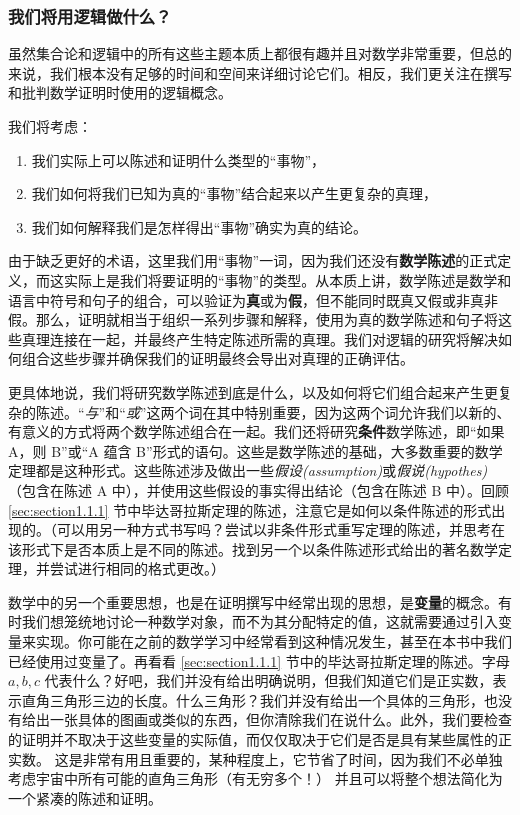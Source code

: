 \subsubsection*{我们将用逻辑做什么？}

虽然集合论和逻辑中的所有这些主题本质上都很有趣并且对数学非常重要，但总的来说，我们根本没有足够的时间和空间来详细讨论它们。相反，我们更关注在撰写和批判数学证明时使用的逻辑概念。

我们将考虑：

\begin{enumerate}
    \item 我们实际上可以陈述和证明什么类型的“事物”，
    \item 我们如何将我们已知为真的“事物”结合起来以产生更复杂的真理，
    \item 我们如何解释我们是怎样得出“事物”确实为真的结论。
\end{enumerate}

由于缺乏更好的术语，这里我们用“事物”一词，因为我们还没有\textbf{数学陈述}的正式定义，而这实际上是我们将要证明的“事物”的类型。从本质上讲，数学陈述是数学和语言中符号和句子的组合，可以验证为\textbf{真}或为\textbf{假}，但不能同时既真又假或非真非假。那么，证明就相当于组织一系列步骤和解释，使用为真的数学陈述和句子将这些真理连接在一起，并最终产生特定陈述所需的真理。我们对逻辑的研究将解决如何组合这些步骤并确保我们的证明最终会导出对真理的正确评估。

更具体地说，我们将研究数学陈述到底是什么，以及如何将它们组合起来产生更复杂的陈述。“\textit{与}”和“\textit{或}”这两个词在其中特别重要，因为这两个词允许我们以新的、有意义的方式将两个数学陈述组合在一起。我们还将研究\textbf{条件}数学陈述，即“如果 A，则 B”或“A 蕴含 B”形式的语句。这些是数学陈述的基础，大多数重要的数学定理都是这种形式。这些陈述涉及做出一些\textit{假设(assumption)}或\textit{假说(hypothes)}（包含在陈述 A 中），并使用这些假设的事实得出结论（包含在陈述 B 中）。回顾 \ref{sec:section1.1.1} 节中毕达哥拉斯定理的陈述，注意它是如何以条件陈述的形式出现的。（可以用另一种方式书写吗？尝试以非条件形式重写定理的陈述，并思考在该形式下是否本质上是不同的陈述。找到另一个以条件陈述形式给出的著名数学定理，并尝试进行相同的格式更改。）

数学中的另一个重要思想，也是在证明撰写中经常出现的思想，是\textbf{变量}的概念。有时我们想笼统地讨论一种数学对象，而不为其分配特定的值，这就需要通过引入变量来实现。你可能在之前的数学学习中经常看到这种情况发生，甚至在本书中我们已经使用过变量了。再看看 \ref{sec:section1.1.1} 节中的毕达哥拉斯定理的陈述。字母 $a,b,c$ 代表什么？好吧，我们并没有给出明确说明，但我们知道它们是正实数，表示直角三角形三边的长度。什么三角形？我们并没有给出一个具体的三角形，也没有给出一张具体的图画或类似的东西，但你清除我们在说什么。此外，我们要检查的证明并不取决于这些变量的实际值，而仅仅取决于它们是否是具有某些属性的正实数。 这是非常有用且重要的，某种程度上，它节省了时间，因为我们不必单独考虑宇宙中所有可能的直角三角形（有无穷多个！） 并且可以将整个想法简化为一个紧凑的陈述和证明。

